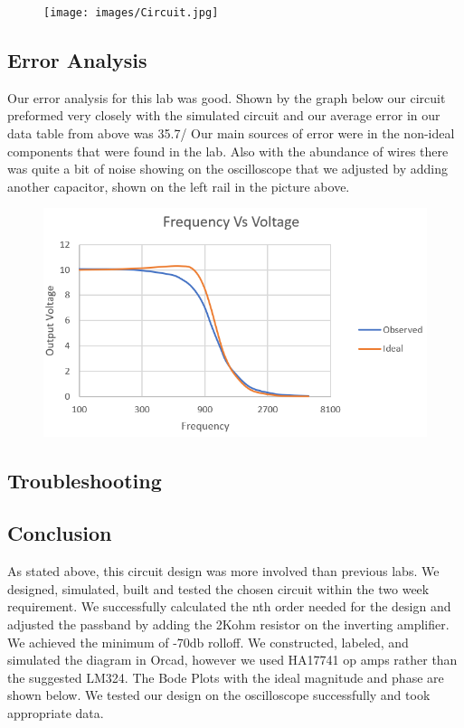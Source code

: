 \documentclass[11pt]{article}
\begin{document}
\begin{figure}[H]
	    \centering
	    \texttt{[image: images/Circuit.jpg]}
	 \end{figure}
	 \newpage
	\subsection*{Error Analysis}
	Our error analysis for this lab was good. Shown by the graph below our circuit preformed very closely with the simulated circuit and our average error in our data table from above was 35.7/%
	Our main sources of error were in the non-ideal components that were found in the lab. Also with the abundance of wires there was quite a bit of noise showing on the oscilloscope that we adjusted by adding another capacitor, shown on the left rail in the picture above. 			
	\begin{figure}[H]
		\centering
		\includegraphics[width=5.5in]{images/comparison_graph.PNG}
	\end{figure}
\subsection*{Troubleshooting}

\subsection*{Conclusion}
	As stated above, this circuit design was more involved than previous labs. We designed, simulated, built and tested the chosen circuit within the two week requirement. We successfully calculated the nth order needed for the design and adjusted the passband by adding the 2Kohm resistor on the inverting amplifier. We achieved the minimum of -70db rolloff. We constructed, labeled, and simulated the diagram in Orcad, however we used HA17741 op amps rather than the suggested LM324. The Bode Plots with the ideal magnitude and phase are shown below. We tested our design on the oscilloscope successfully and took appropriate data.
\newpage
\end{document}
